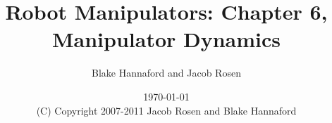 \documentclass[oneside]{book}
\begin{document}
\setpagewiselinenumbers
\modulolinenumbers[5]

\setcounter{chapter}{0}


 \title{Robot Manipulators: Chapter 6, Manipulator Dynamics}

 \author{Blake Hannaford and Jacob Rosen}

 \date{\today\\(C) Copyright 2007-2011 Jacob Rosen and Blake Hannaford}

 \maketitle

\tableofcontents

\mainmatter

\linenumbers
%
%
%
%

% 
\setcounter{chapter}{5}
% 
% 
%  
% 
%
% 
% 
% 
%
%
% 
% 
%  
% 
% 
% 


% 

%
\label{LastPage}
\end{document}
